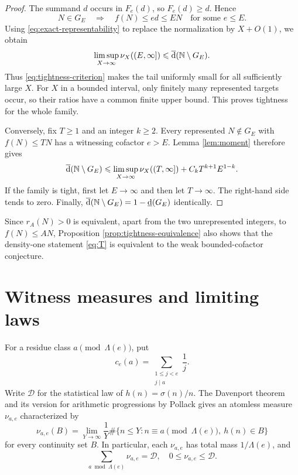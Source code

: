 \documentclass[11pt,letterpaper,reqno]{amsart}
\numberwithin{equation}{section}
\theoremstyle{remark}
\newcommand{\N}{\mathbb{N}}
\newcommand{\1}{\mathbf 1}
\newcommand{\lowerdens}{\underline{\textup{d}}}
\newcommand{\upperdens}{\overline{\textup{d}}}
\renewcommand{\leq}{\leqslant}
\renewcommand{\geq}{\geqslant}
\begin{document}
\begin{proof}
The summand $d$ occurs in $F_e(d)$, so $F_e(d)\geq d$. Hence
\[
 N\in G_E\quad\Longrightarrow\quad f(N)\leq ed\leq EN
 \quad\text{for some }e\leq E.
\]
Using \eqref{eq:exact-representability} to replace the normalization by
$X+O(1)$, we obtain
\[
 \limsup_{X\to\infty}\nu_X((E,\infty])
 \leq\upperdens(\N\setminus G_E).
\]
Thus \eqref{eq:tightness-criterion} makes the tail uniformly small for
all sufficiently large $X$. For $X$ in a bounded interval, only finitely
many represented targets occur, so their ratios have a common finite
upper bound. This proves tightness for the whole family.

Conversely, fix $T\geq1$ and an integer $k\geq2$. Every represented
$N\notin G_E$ with $f(N)\leq TN$ has a witnessing cofactor $e>E$.
Lemma \ref{lem:moment} therefore gives
\[
 \upperdens(\N\setminus G_E)
 \leq\limsup_{X\to\infty}\nu_X((T,\infty])
 +C_kT^{k+1}E^{1-k}.
\]
If the family is tight, first let $E\to\infty$ and then let $T\to\infty$.
The right-hand side tends to zero. Finally,
$\upperdens(\N\setminus G_E)=1-\lowerdens(G_E)$ identically.
\end{proof}

Since $r_A(N)>0$ is equivalent, apart from the two unrepresented integers,
to $f(N)\leq AN$, Proposition \ref{prop:tightness-equivalence} also shows
that the density-one statement \eqref{eq:T} is equivalent to the weak
bounded-cofactor conjecture.


\section{Witness measures and limiting laws}

For a residue class $a\pmod{\Lambda(e)}$, put
\[
 c_e(a)=\sum_{\substack{1\leq j<e\\j\mid a}}\frac1j.
\]
Write $\mathcal{D}$ for the statistical law of
$h(n)=\sigma(n)/n$. The Davenport theorem \cite{Davenport} and its version for arithmetic
progressions by Pollack \cite[Lemma~2]{PollackPalindromes}
gives an atomless measure $\nu_{a,e}$ characterized by
\[
 \nu_{a,e}(B)
 =\lim_{Y\to\infty}\frac1Y
 \#\{n\leq Y:n\equiv a\pmod{\Lambda(e)},\ h(n)\in B\}
\]
for every continuity set $B$. In particular,
each $\nu_{a,e}$ has total mass $1/\Lambda(e)$, and
\begin{equation}
\label{eq:dadd:progression-domination}
 \sum_{a\bmod \Lambda(e)}\nu_{a,e}=\mathcal{D},
 \quad 0\leq\nu_{a,e}\leq\mathcal{D}.
\end{equation}
\end{document}
